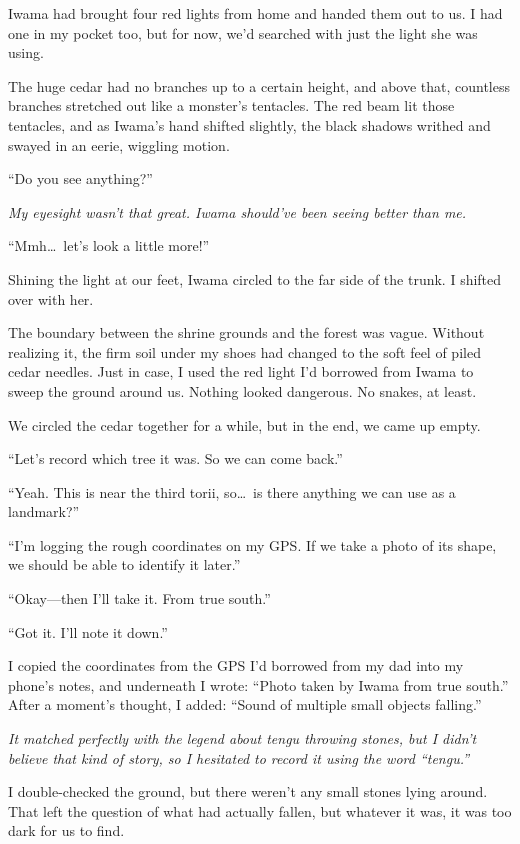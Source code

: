 \documentclass[
    a4paper,
    12pt,
    twoside,
    openany,
    UTF8,
    fontset=windows
]{ctexbook}
\begin{document}
Iwama had brought four red lights from home and handed them out to us. I had one in my pocket too, but for now, we’d searched with just the light she was using.

The huge cedar had no branches up to a certain height, and above that, countless branches stretched out like a monster's tentacles. The red beam lit those tentacles, and as Iwama's hand shifted slightly, the black shadows writhed and swayed in an eerie, wiggling motion.

``Do you see anything?''

\textit{My eyesight wasn't that great. Iwama should've been seeing better than me.}

``Mmh\dots\ let's look a little more!''

Shining the light at our feet, Iwama circled to the far side of the trunk. I shifted over with her.

The boundary between the shrine grounds and the forest was vague. Without realizing it, the firm soil under my shoes had changed to the soft feel of piled cedar needles. Just in case, I used the red light I'd borrowed from Iwama to sweep the ground around us. Nothing looked dangerous. No snakes, at least.

We circled the cedar together for a while, but in the end, we came up empty.

``Let's record which tree it was. So we can come back.''

``Yeah. This is near the third torii, so\dots\ is there anything we can use as a landmark?''

``I'm logging the rough coordinates on my GPS. If we take a photo of its shape, we should be able to identify it later.''

``Okay---then I'll take it. From true south.''

``Got it. I'll note it down.''

I copied the coordinates from the GPS I'd borrowed from my dad into my phone's notes, and underneath I wrote: ``Photo taken by Iwama from true south.'' After a moment's thought, I added: ``Sound of multiple small objects falling.''

\textit{It matched perfectly with the legend about tengu throwing stones, but I didn't believe that kind of story, so I hesitated to record it using the word ``tengu.''}

I double-checked the ground, but there weren't any small stones lying around. That left the question of what had actually fallen, but whatever it was, it was too dark for us to find.
\end{document}
